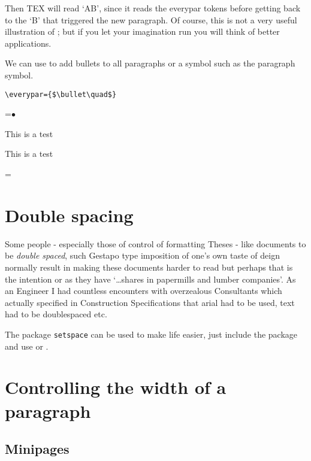 Then TEX will read `AB', since it reads the everypar tokens before getting back to the
`B' that triggered the new paragraph. Of course, this is not a very useful illustration of
; but if you let your imagination run you will think of better applications.

{{\everypar{\onebold}
\small 
\lorem

\lorem
}

We can use  to add bullets to all paragraphs or a symbol such as the paragraph symbol.
\medskip

\verb+\everypar={$\bullet\quad$}+

\medskip

\everypar={$\bullet\quad$}

This is a test

This is a test

\everypar={}


\section{Double spacing}
Some people - especially those of control of formatting Theses - like documents to be \textit{double spaced}, such Gestapo type imposition of one's own taste of deign normally result in making these documents harder to read but perhaps that is the intention or as \cite{Abrahams2003} \cite{Wilson2009} they have `\ldots shares in papermills and lumber companies'. As an Engineer I had countless encounters with overzealous Consultants which actually specified in Construction Specifications that arial had to be used, text had to be doublespaced etc. 

The package \texttt{setspace} \cite{setspace} can be used to make life easier, just include the package and use  or .

\section{Controlling the width of a paragraph}
\subsection{Minipages}

\begin{fullwidth}
\begin{minipage}{6.7cm}
\parindent=0pt 
{\obeylines

}
\end{minipage}
\end{fullwidth}}
